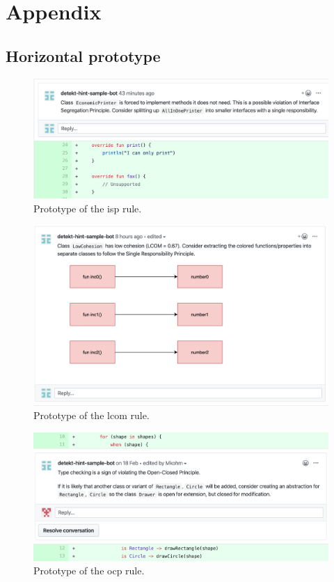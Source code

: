 \clearpage
\chapter{Appendix}

\section{Horizontal prototype}
\label{horizontal-prototype-images}

\begin{figure}[h!]
    \centering
    \includegraphics[width=\textwidth]{../images/comment_isp.png}
    \caption{Prototype of the \gls{isp} rule.}
    \label{fig:isp}
\end{figure}


\begin{figure}[h!]
    \centering
    \includegraphics[width=\textwidth]{../images/comment_lackOfCohesion.png}
    \caption{Prototype of the \gls{lcom} rule.}
    \label{fig:lcom}
\end{figure}


\begin{figure}[h!]
    \centering
    \includegraphics[width=\textwidth]{images/comment_ocp2.png}
    \caption{Prototype of the \gls{ocp} rule.}
    \label{fig:ocp}
\end{figure}


